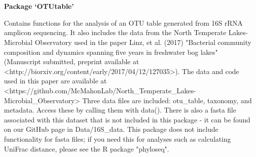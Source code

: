 \documentclass[a4paper]{book}
\begin{document}
\chapter*{}
\begin{center}
{\textbf{\huge Package `OTUtable'}}
\par\bigskip{\large \today}
\end{center}
\begin{description}
\raggedright{}
\item[Type]
\item[Title]
\item[Version]
\item[Date]
\item[Author]
\item[Maintainer]\AsIs{}
\item[Description]
\item[License]
\item[LazyLoad]
\item[Depends]
\item[NeedsCompilation]
\end{description}
%
\begin{Description}\relax
Contains functions for the analysis of an OTU table generated from 16S rRNA amplicon sequencing. It also includes the data from the North Temperate Lakes-Microbial Observatory used in the paper Linz, et al. (2017) "Bacterial community composition and dynamics spanning five years in freshwater bog lakes" (Manuscript submitted, preprint available at <http://biorxiv.org/content/early/2017/04/12/127035>). The data and code used in this paper are available at <https://github.com/McMahonLab/North\_Temperate\_Lakes-Microbial\_Observatory>
Three data files are included: otu\_table, taxonomy, and metadata. Access these by calling them with data(). There is also a fasta file associated with this dataset that is not included in this package - it can be found on our GitHub page in Data/16S\_data. This package does not include functionality for fasta files; if you need this for analyses such as calculating UniFrac distance, please see the R package "phyloseq".
\end{Description}
\end{document}
